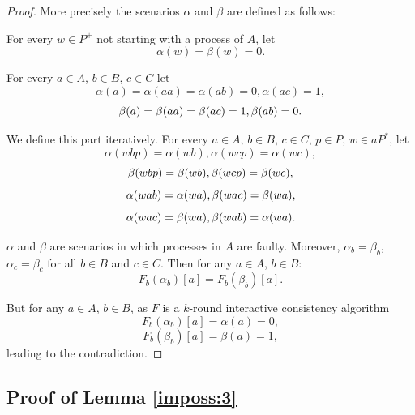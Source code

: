\begin{proof}
More precisely  the scenarios $\alpha$
  and $\beta$ are defined as follows:
  \begin{enumerateroman}
    \item For every $w \in P^{+}$ not starting with a process of $A$, let
    \[ \alpha ( w ) = \beta ( w ) =0. \]
    \item For every $a \in A$, $b \in B$, $c \in C$ let
    \[ \alpha ( a ) = \alpha ( a a )  =  \alpha ( a b ) =0, \alpha ( a c )  =
       1, \]
    \[ \beta ( a ) = \beta ( a a ) = \beta ( a c ) =1  , \beta ( a b )
       =0. \]
    \item We define this part iteratively. For every $a \in A$, $b \in B$, $c \in C$, $p \in P$, $w \in
    a P^{\ast}$, let
    \[ \alpha ( w b p ) = \alpha ( w b ) , \alpha ( w c p ) = \alpha ( w c ) ,
    \]
    \[ \beta ( w b p ) = \beta ( w b )  , \beta ( w c p ) =\beta ( w c ) ,
    \]
    \[ \alpha ( w a b ) = \alpha ( w a )  , \beta ( w a c ) = \beta (
       w a ) , \]
    \[ \alpha ( w a c ) = \beta ( w a )  , \beta ( w a b ) = \alpha
       ( w a ) . \]
  \end{enumerateroman}
 $\alpha$ and $\beta$ are scenarios in which processes in $A$ are faulty.
  Moreover, $\alpha_{b} =
  \beta_{b}$, $\alpha_{c} = \beta_{c}$ for all $b \in B$ and $c \in C$. 
  Then for any $a \in A$, $b \in B$:
   \[ F_b ( \alpha_{b} )[a] =F_b ( \beta_{b} )[a]. \]

  
But for any $a \in A$, $b \in B$, as $F$ is a $k$-round  interactive consistency algorithm
  \[ F_b ( \alpha_{b} )[a] = \alpha ( a )
     =0, \]
       \[ F_b ( \beta_{b} )[a] = \beta ( a )
     =1, \]
  leading to the contradiction.
\end{proof}

\subsection{Proof of Lemma \ref{imposs:3}} \label{app:imposs:3}

